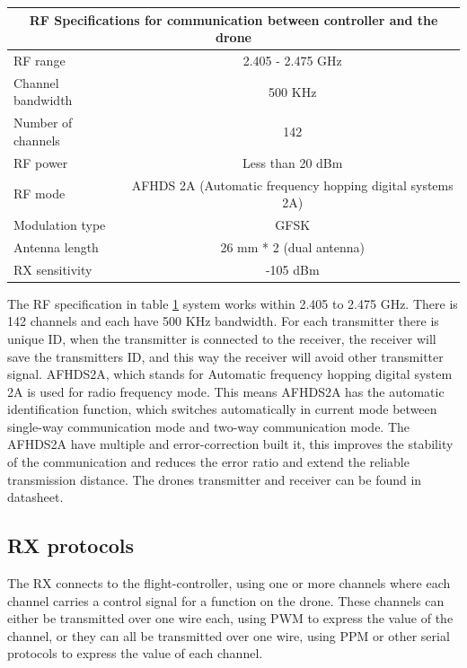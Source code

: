 \begin{table}[H] \label{tab:RFSpec}
\begin{tabular}{|l|c|}
\hline
\multicolumn{2}{|c|}{\textbf{RF Specifications for communication between controller and the drone}}                               \\ \hline
RF range           & 2.405 - 2.475 GHz                                         \\ \hline
Channel bandwidth  & 500 KHz                                                   \\ \hline
Number of channels & 142                                                       \\ \hline
RF power           & Less than 20 dBm                                          \\ \hline
RF mode            & AFHDS 2A (Automatic frequency hopping digital systems 2A) \\ \hline
Modulation type    & GFSK                                                      \\ \hline
Antenna length     & 26 mm * 2 (dual antenna)                                  \\ \hline
RX sensitivity     & -105 dBm                                                  \\ \hline
\end{tabular}
\end{table}
The RF specification in table \ref{tab:RFSpec} system works within 2.405 to 2.475 GHz. There is 142 channels and each have 500 KHz bandwidth. For each transmitter there is unique ID, when the transmitter is connected to the receiver, the receiver will save the transmitters ID, and this way the receiver will avoid other transmitter signal.
AFHDS2A, which stands for Automatic frequency hopping digital system 2A is used for radio frequency mode. This means AFHDS2A has the automatic identification function, which switches automatically in current mode between single-way communication mode and two-way communication mode. The AFHDS2A have multiple and error-correction built it, this improves the stability of the communication and reduces the error ratio and extend the reliable transmission distance. The drones transmitter and receiver can be found in datasheet.










\subsection*{RX protocols}\label{ss:rxprotococls} 
The RX connects to the flight-controller, using one or more channels where each channel carries a control signal for a function on the drone. These channels can either be transmitted over one wire each, using PWM to express the value of the channel, or they can all be transmitted over one wire, using PPM or other serial protocols to express the value of each channel.\\

